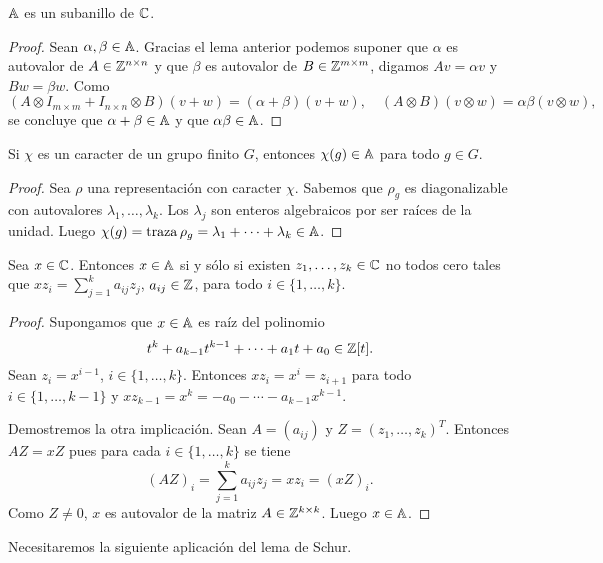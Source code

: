 \begin{theorem}
  \label{theorem:subanillo}
  $\mathbb{A}$ es un subanillo de $\mathbb{C}$.
\end{theorem}

\begin{proof}
  Sean $\alpha,\beta\in\mathbb{A}$. Gracias el lema anterior podemos suponer que $\alpha$ es autovalor de
  $A\in\mathbb{Z}^{n\times n}$ y que $\beta$ es autovalor de $B\in\mathbb{Z}^{m\times m}$, digamos
  $Av=\alpha v$ y $Bw=\beta w$.  Como 
  \[
	(A\otimes I_{m\times m}+I_{n\times n}\otimes B)(v+w)=(\alpha+\beta)(v+w),
	\quad
	(A\otimes B)(v\otimes w)=\alpha\beta(v\otimes w),
  \]
  se concluye que $\alpha+\beta\in\mathbb{A}$ y que $\alpha\beta\in\mathbb{A}$. 
\end{proof}

\begin{theorem}
  \label{theorem:chi(g)inA}
  Si $\chi$ es un caracter de un grupo finito $G$, entonces $\chi(g)\in\mathbb{A}$ para todo
  $g\in G$.
\end{theorem}

\begin{proof}
  Sea $\rho$ una representación con caracter $\chi$. Sabemos que $\rho_g$
  es diagonalizable con autovalores $\lambda_1,\dots,\lambda_k$. Los
  $\lambda_j$ son enteros algebraicos por ser raíces de la unidad. Luego
  $\chi(g)=\operatorname{traza}\rho_g=\lambda_1+\cdots+\lambda_k\in\mathbb{A}$.
\end{proof}

\begin{lemma}
  \label{lem:combinacion_lineal}
  Sea $x\in\mathbb{C}$. Entonces $x\in\mathbb{A}$ si y sólo si existen $z_1,\dots,z_k\in\mathbb{C}$ no
  todos cero tales que $xz_i=\sum_{j=1}^ka_{ij}z_j$, $a_{ij}\in\mathbb{Z}$, para todo
  $i\in\{1,\dots,k\}$.
\end{lemma}

\begin{proof}
  Supongamos que $x\in\mathbb{A}$ es raíz del polinomio 
  \[
    t^k+a_{k-1}t^{k-1}+\cdots+a_1t+a_0\in\mathbb{Z}[t].
  \]
  Sean $z_i=x^{i-1}$, $i\in\{1,\dots,k\}$. Entonces $xz_i=x^i=z_{i+1}$ para
  todo $i\in\{1,\dots,k-1\}$ y $xz_{k-1}=x^k=-a_{0}-\cdots-a_{k-1}x^{k-1}$.

  Demostremos la otra implicación. Sean $A=(a_{ij})$ y $Z=(z_1,\dots,z_k)^T$. 
  Entonces $AZ=xZ$ pues para cada $i\in\{1,\dots,k\}$ se tiene
  \[
    (AZ)_i=\sum_{j=1}^ka_{ij}z_j=xz_i=(xZ)_i.
  \]
  Como $Z\ne0$, $x$ es autovalor de la matriz $A\in\mathbb{Z}^{k\times k}$. Luego
  $x\in\mathbb{A}$.
\end{proof}

Necesitaremos la siguiente aplicación del lema de Schur.

